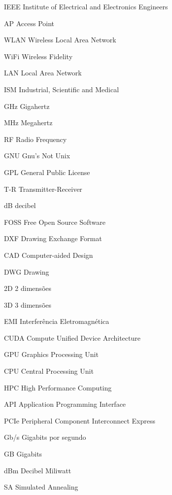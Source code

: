 \documentclass[
	12pt,				%
	openright,			%
	twoside,			%
	a4paper,			%
	english,			%
	french,				%
	spanish,			%
	brazil				%
	]{abntex2}
\begin{document}
\listoffigures*
\cleardoublepage

\listoftables*
\cleardoublepage

\begin{siglas}
  \item[IEEE] Institute of Electrical and Electronics Engineers
  \item[AP] Access Point
  \item[WLAN] Wireless Local Area Network
  \item[WiFi] Wireless Fidelity
  \item[LAN] Local Area Network
  \item[ISM] Industrial, Scientific and Medical
  \item[GHz] Gigahertz
  \item[MHz] Megahertz
  \item[RF] Radio Frequency
  \item[GNU] Gnu's Not Unix
  \item[GPL] General Public License
  \item[T-R] Transmitter-Receiver
  \item[dB] decibel
  \item[FOSS] Free Open Source Software
  \item[DXF] Drawing Exchange Format
  \item[CAD] Computer-aided Design
  \item[DWG] Drawing
  \item[2D] 2 dimensões
  \item[3D] 3 dimensões
  \item[EMI] Interferência Eletromagnética
  \item[CUDA] Compute Unified Device Architecture
  \item[GPU] Graphics Processing Unit
  \item[CPU] Central Processing Unit
  \item[HPC] High Performance Computing
  \item[API] Application Programming Interface
  \item[PCIe] Peripheral Component Interconnect Express
  \item[Gb/s] Gigabits por segundo
  \item[GB] Gigabits
  \item[dBm] Decibel Miliwatt
  \item[SA] Simulated Annealing
\end{siglas}
\end{document}
